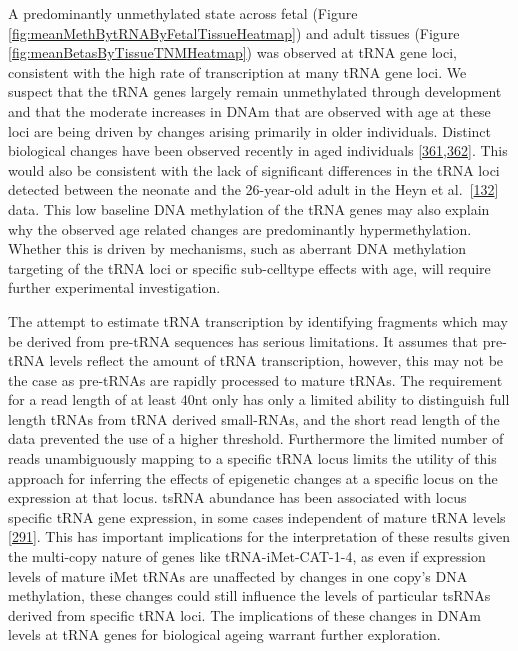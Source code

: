 \documentclass[
]{book}
\begin{document}
A predominantly unmethylated state across fetal (Figure \ref{fig:meanMethBytRNAByFetalTissueHeatmap}) and adult tissues (Figure \ref{fig:meanBetasByTissueTNMHeatmap}) was observed at tRNA gene loci, consistent with the high rate of transcription at many tRNA gene loci.
We suspect that the tRNA genes largely remain unmethylated through development and that the moderate increases in DNAm that are observed with age at these loci are being driven by changes arising primarily in older individuals.
Distinct biological changes have been observed recently in aged individuals {[}\protect\hyperlink{ref-Moskowitz2017}{361},\protect\hyperlink{ref-Hashimoto2019}{362}{]}.
This would also be consistent with the lack of significant differences in the tRNA loci detected between the neonate and the 26-year-old adult in the Heyn et al.~{[}\protect\hyperlink{ref-Heyn2012}{132}{]} data.
This low baseline DNA methylation of the tRNA genes may also explain why the observed age related changes are predominantly hypermethylation.
Whether this is driven by mechanisms, such as aberrant DNA methylation targeting of the tRNA loci or specific sub-celltype effects with age, will require further experimental investigation.

The attempt to estimate tRNA transcription by identifying fragments which may be derived from pre-tRNA sequences has serious limitations.
It assumes that pre-tRNA levels reflect the amount of tRNA transcription, however, this may not be the case as pre-tRNAs are rapidly processed to mature tRNAs.
The requirement for a read length of at least 40nt only has only a limited ability to distinguish full length tRNAs from tRNA derived small-RNAs, and the short read length of the data prevented the use of a higher threshold.
Furthermore the limited number of reads unambiguously mapping to a specific tRNA locus limits the utility of this approach for inferring the effects of epigenetic changes at a specific locus on the expression at that locus.
tsRNA abundance has been associated with locus specific tRNA gene expression, in some cases independent of mature tRNA levels {[}\protect\hyperlink{ref-Torres2019}{291}{]}.
This has important implications for the interpretation of these results given the multi-copy nature of genes like tRNA-iMet-CAT-1-4, as even if expression levels of mature iMet tRNAs are unaffected by changes in one copy's DNA methylation, these changes could still influence the levels of particular tsRNAs derived from specific tRNA loci.
The implications of these changes in DNAm levels at tRNA genes for biological ageing warrant further exploration.
\end{document}
